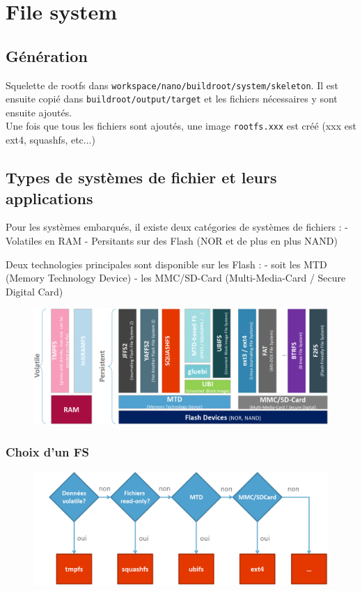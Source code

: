 \documentclass[resume]{subfiles}
\begin{document}
\section{File system}
\subsection{Génération}
Squelette de rootfs dans \verb!workspace/nano/buildroot/system/skeleton!. Il est ensuite copié dans \verb!buildroot/output/target! et les fichiers nécessaires y sont ensuite ajoutés.\\
Une fois que tous les fichiers sont ajoutés, une image \verb!rootfs.xxx! est créé (xxx est ext4, squashfs, etc...)

\subsection{Types de systèmes de fichier et leurs applications}

Pour les systèmes embarqués, il existe deux catégories de systèmes de fichiers :
- Volatiles en RAM
- Persitants sur des Flash (NOR et de plus en plus NAND)

Deux technologies principales sont disponible sur les Flash :  
- soit les MTD (Memory Technology Device)
- les MMC/SD-Card (Multi-Media-Card / Secure Digital Card)

\begin{figure}[H]
    \centering
    \includegraphics[width=1\columnwidth]{Figures/fileSystem/fileSystemType.PNG}
    \label{fig:fileSystemType}
\end{figure}

\subsubsection{Choix d'un FS}
\begin{figure}[H]
    \centering
    \includegraphics[width=0.8\columnwidth]{Figures/fileSystem/fileSystemChoice.PNG}
    \label{fig:fileSystemChoice}
\end{figure}
\end{document}
